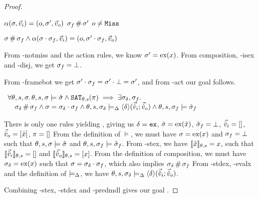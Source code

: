 \begin{proof}

\pfassume \begin{hypvlist}
 $\alpha(\sigma,\vec{v}_i)=(o,\sigma',\vec{v}_o)$
 $\sigma_f\operatorname{\#}\sigma'$
 $o\neq\texttt{Miss}$
\end{hypvlist}
\pfprove \begin{goalvlist}
 $\sigma \operatorname{\#} \sigma_f \land \alpha(\sigma\cdot\sigma_f, \vec{v}_i)=(o, \sigma'\cdot\sigma_f, \vec{v}_o)$	
\end{goalvlist}
\begin{hypvlist}
 From \hyp{notmiss} and the action rules, we know $\sigma'=\text{ex}(x)$.
 From composition, \hyp{isex} and \hyp{disj}, we get $\sigma_f=\bot$.
\end{hypvlist}
From \hyp{framebot} we get $\sigma'\cdot\sigma_f=\sigma'\cdot\bot=\sigma'$, and from \hyp{act} our goal  follows.


\pfassume \begin{hypvlist}
 
\end{hypvlist}
\pfprove \begin{goalvlist}
 $\begin{array}{l}
\forall \theta,s,\sigma\ldotp \theta,s,\sigma\models \hat{\sigma} \land \texttt{SAT}_{\mathit{\theta,s}}(\pi) \implies \exists \sigma_\delta, \sigma_f \ldotp\\
\quad  \sigma_\delta\operatorname{\#}\sigma_f \land \sigma=\sigma_\delta\cdot\sigma_f \land \theta, s, \sigma_\delta \models_{\Delta} \left<\delta\right>\!(\vec{\hat{v}}_i;\vec{\hat{v}}_o) \land \theta,s,\sigma_f\models \hat{\sigma}_f 
\end{array}$
\end{goalvlist}
\begin{hypvlist}
 There is only one \consume{} rules yielding \Ok, giving us $\delta=\texttt{ex}$, $\hat{\sigma}=\text{ex}(\hat{x})$, $\hat{\sigma}_f=\bot$, $\vec{\hat{v}}_i=[]$, $\vec{\hat{v}}_o=[\hat{x}]$, $\pi=[]$
 From the definition of $\models$, we must have $\sigma=\text{ex}(x)$ and $\sigma_f=\bot$ such that $\theta,s,\sigma\models\hat{\sigma}$ and $\theta,s,\sigma_f\models\hat{\sigma}_f$.
 From \hyp{stex}, we have $\llbracket\hat{x}\rrbracket_{\theta,s}=x$, such that $\llbracket\vec{\hat{v}}_i\rrbracket_{\theta,s}=[]$ and $\llbracket\vec{\hat{v}}_o\rrbracket_{\theta,s}=[x]$.
 From the definition of composition, we must have $\sigma_\delta=\text{ex}(x)$ such that $\sigma=\sigma_\delta\cdot\sigma_f$, which also implies $\sigma_\delta\operatorname{\#}\sigma_f$
 From \hyp{stdex}, \hyp{evalx} and the definition of $\models_{\Delta}$, we have $\theta,s,\sigma_\delta\models_{\Delta} \left<\delta\right>\!(\vec{\hat{v}}_i;\vec{\hat{v}}_o)$.
\end{hypvlist}
Combining \hyp{stex}, \hyp{stdex} and \hyp{predmdl} gives our goal .


\end{proof}
